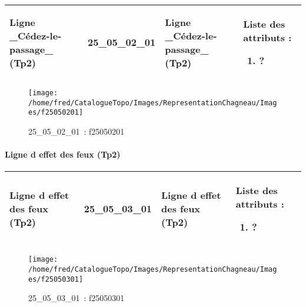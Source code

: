 \documentclass[12pt,titlepage]{book}
\begin{document}
\renewcommand{\arraystretch}{1.2}
\begin{supertabular}{|p{10cm}|c|p{13cm}|p{12cm}|}
 Ligne \_Cédez-le-passage\_ (Tp2) & 25\_05\_02\_01 & Ligne \_Cédez-le-passage\_ (Tp2) & Liste des attributs :
\begin{enumerate}
  \item ?\end{enumerate}
\\
\hline
\end{supertabular}
\begin{figure}[h!]
  \hfill         %
  \begin{minipage}[t]{3cm}
    \begin{center}
      \texttt{[image: /home/fred/CatalogueTopo/Images/RepresentationChagneau/Images/f25050201]}
      \caption[~25\_05\_02\_01]{\small{25\_05\_02\_01~:} \tiny{f25050201}}\label{f25050201}
    \end{center}
  \end{minipage}
\end{figure}


\paragraph{Ligne d effet des feux (Tp2)}
\noindent
\vspace{\baselineskip}

\renewcommand{\arraystretch}{1.2}
\begin{supertabular}{|p{10cm}|c|p{13cm}|p{12cm}|}
 Ligne d effet des feux (Tp2) & 25\_05\_03\_01 & Ligne d effet des feux (Tp2) & Liste des attributs :
\begin{enumerate}
  \item ?\end{enumerate}
\\
\hline
\end{supertabular}
\begin{figure}[h!]
  \hfill         %
  \begin{minipage}[t]{3cm}
    \begin{center}
      \texttt{[image: /home/fred/CatalogueTopo/Images/RepresentationChagneau/Images/f25050301]}
      \caption[~25\_05\_03\_01]{\small{25\_05\_03\_01~:} \tiny{f25050301}}\label{f25050301}
    \end{center}
  \end{minipage}
\end{figure}
\end{document}
